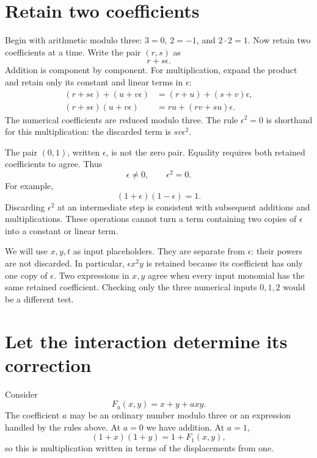 \documentclass[11pt,letterpaper]{article}
\numberwithin{equation}{section}
\theoremstyle{definition}\newtheorem{example}[theorem]{Example}
\begin{document}
\clearpage
\tableofcontents
\clearpage

\section{Retain two coefficients}\label{sec:parameter}

Begin with arithmetic modulo three: \(3=0\), \(2=-1\), and \(2\cdot2=1\). Now retain two coefficients at a time. Write the pair \((r,s)\) as
\[
 r+s\epsilon.
\]
Addition is component by component. For multiplication, expand the product and retain only its constant and linear terms in \(\epsilon\):
\begin{align}
 (r+s\epsilon)+(u+v\epsilon)&=(r+u)+(s+v)\epsilon,\\
 (r+s\epsilon)(u+v\epsilon)&=ru+(rv+su)\epsilon.
 \label{eq:two-coefficients}
\end{align}
The numerical coefficients are reduced modulo three. The rule \(\epsilon^2=0\) is shorthand for this multiplication: the discarded term is \(sv\epsilon^2\).

The pair \((0,1)\), written \(\epsilon\), is not the zero pair. Equality requires both retained coefficients to agree. Thus
\[
 \epsilon\ne0,\qquad \epsilon^2=0.
\]
For example,
\[
 (1+\epsilon)(1-\epsilon)=1.
\]
Discarding \(\epsilon^2\) at an intermediate step is consistent with subsequent additions and multiplications. These operations cannot turn a term containing two copies of \(\epsilon\) into a constant or linear term.

We will use \(x,y,t\) as input placeholders. They are separate from \(\epsilon\): their powers are not discarded. In particular, \(\epsilon x^2y\) is retained because its coefficient has only one copy of \(\epsilon\). Two expressions in \(x,y\) agree when every input monomial has the same retained coefficient. Checking only the three numerical inputs \(0,1,2\) would be a different test.

\section{Let the interaction determine its correction}\label{sec:repair}

Consider
\begin{equation}\label{eq:family}
 F_a(x,y)=x+y+a xy.
\end{equation}
The coefficient \(a\) may be an ordinary number modulo three or an expression handled by the rules above. At \(a=0\) we have addition. At \(a=1\),
\[
 (1+x)(1+y)=1+F_1(x,y),
\]
so this is multiplication written in terms of the displacements from one.
\end{document}
